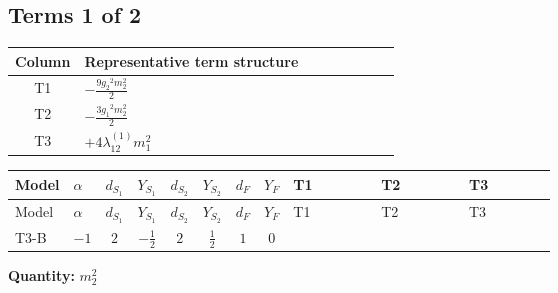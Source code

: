 \documentclass[8pt]{article}
\begin{document}
\begin{landscape}
\subsection*{Terms 1 of 2}
\begin{center}
\begin{tabular}{@{}c >{\raggedright\arraybackslash}p{0.82\linewidth}@{}}
\toprule
Column & Representative term structure \\
\midrule
T1 & \(\displaystyle -\frac{9 {g_2}^2 {m_2^2}}{2}\) \\
\midrule
T2 & \(\displaystyle -\frac{3 {g_1}^2 {m_2^2}}{2}\) \\
\midrule
T3 & \(\displaystyle +4 {\lambda_{12}^{(1)}} {m_1^2}\) \\
\midrule
\bottomrule
\end{tabular}
\end{center}
\smallskip
\tiny
\begin{longtable}{@{}llcccccc >{\raggedright\arraybackslash}p{0.21\linewidth} >{\raggedright\arraybackslash}p{0.21\linewidth} >{\raggedright\arraybackslash}p{0.21\linewidth}@{}}
\toprule
Model & $\alpha$ & $d_{S_1}$ & $Y_{S_1}$ & $d_{S_2}$ & $Y_{S_2}$ & $d_F$ & $Y_F$ & T1 & T2 & T3 \\
\midrule
\endfirsthead
\toprule
Model & $\alpha$ & $d_{S_1}$ & $Y_{S_1}$ & $d_{S_2}$ & $Y_{S_2}$ & $d_F$ & $Y_F$ & T1 & T2 & T3 \\
\midrule
\endhead
T3-B & $-1$ & $2$ & $-\frac{1}{2}$ & $2$ & $\frac{1}{2}$ & $1$ & $0$ & \scriptsize\adjustbox{max width=\linewidth}{$\begin{gathered} -\frac{9 {g_2}^2 {m_2^2}}{2}\end{gathered}$} & \scriptsize\adjustbox{max width=\linewidth}{$\begin{gathered} -\frac{3 {g_1}^2 {m_2^2}}{2}\end{gathered}$} & \scriptsize\adjustbox{max width=\linewidth}{$\begin{gathered} +4 {\lambda_{12}^{(1)}} {m_1^2}\end{gathered}$} \\
\midrule
\bottomrule
\end{longtable}
\clearpage
\noindent\textbf{Quantity: }$m_2^2$\par\smallskip

\end{landscape}
\end{document}
